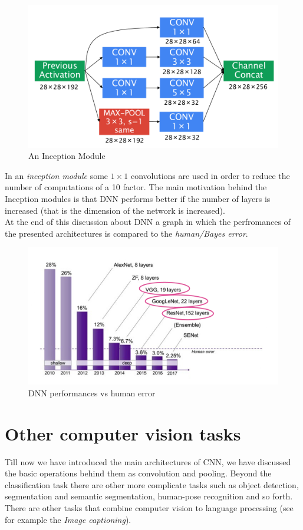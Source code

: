 \begin{figure}[h]
    \centering
    \includegraphics[scale=0.3]{img/InceptionModule.png}
    \caption{An Inception Module}
\end{figure}

\noindent
In an \textit{inception module} some $1{\times}{1}$ convolutions are used in order to reduce the number of computations of a 10 factor.
The main motivation behind the Inception modules is that DNN performs better if the number of layers is increased (that is the dimension of the network is increased).\\

\noindent
At the end of this discussion about DNN a graph in which the perfromances of the presented architectures is compared to the \textit{human/Bayes error}. 

\begin{figure}[h]
    \centering
    \includegraphics[scale=0.5]{img/PerfDNN.png}
    \caption{DNN performances vs human error}
\end{figure}

\section{Other computer vision tasks}
Till now we have introduced the main architectures of CNN, we have discussed the basic operations behind them as convolution and pooling. Beyond the classification task there are other more complicate tasks such as object detection, segmentation and semantic segmentation, human-pose recognition and so forth. There are other tasks that combine computer vision to language processing (see for example the \textit{Image captioning}).\\

